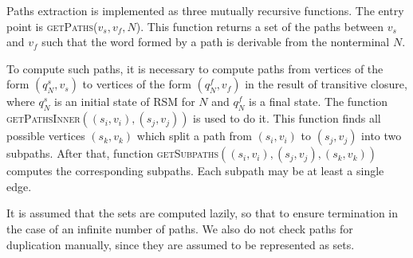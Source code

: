 Paths extraction is implemented as three mutually recursive functions.
The entry point is \textsc{getPaths}($v_s, v_f, N$).
This function returns a set of the paths between $v_s$ and $v_f$ such that the word formed by a path is derivable from the nonterminal $N$.

To compute such paths, it is necessary to compute paths from vertices of the form $(q_N^s,v_s)$ to vertices of the form $(q_N^f, v_f)$ in the result of transitive closure, where $q_N^s$ is an initial state of RSM for $N$ and $q_N^f$ is a final state.
The function \textsc{getPathsInner}$((s_i,v_i),(s_j,v_j))$ is used to do it.
This function finds all possible vertices $(s_k,v_k)$  which split a path from $(s_i,v_i)$ to $(s_j,v_j)$ into two subpaths.
After that, function \textsc{getSubpaths}$((s_i,v_i),(s_j,v_j),(s_k,v_k))$ computes the corresponding subpaths.
Each subpath may be at least a single edge.

It is assumed that the sets are computed lazily, so that to ensure termination in the case of an infinite number of paths.
We also do not check paths for duplication manually, since they are assumed to be represented as sets.

